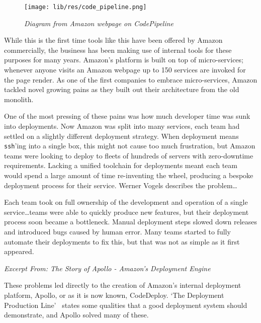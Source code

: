 \documentclass[11pt]{article}
\begin{document}
\begin{figure}
\centering
\texttt{[image: lib/res/code\_pipeline.png]}
\caption{\label{fig:scoping}\textit{Diagram from Amazon webpage on
CodePipeline}}
\end{figure}

While this is the first time tools like this have been offered by Amazon
commercially, the business has been making use of internal tools for these
purposes for many years. Amazon's platform is built on top of micro-services;
whenever anyone visits an Amazon webpage up to 150 services are invoked for the
page render. As one of the first companies to embrace micro-services, Amazon
tackled novel growing pains as they built out their architecture from the old
monolith.

One of the most pressing of these pains was how much developer time was sunk
into deployments. Now Amazon was split into many services, each team had settled
on a slightly different deployment strategy. When deployment means
\texttt{ssh}'ing into a single box, this might not cause too much frustration,
but Amazon teams were looking to deploy to fleets of hundreds of servers with
zero-downtime requirements. Lacking a unified toolchain for deployments meant
each team would spend a large amount of time re-inventing the wheel, producing a
bespoke deployment process for their service. Werner Vogels describes the
problem\dots

\begin{displayquote}

  Each team took on full ownership of the development and operation of a single
  service\dots teams were able to quickly produce new features, but their deployment
  process soon became a bottleneck. Manual deployment steps slowed down releases
  and introduced bugs caused by human error. Many teams started to fully
  automate their deployments to fix this, but that was not as simple as it first
  appeared.

  \textit{Excerpt From: The Story of Apollo - Amazon's Deployment
  Engine~\cite{theStoryOfApollo}}

\end{displayquote}

These problems led directly to the creation of Amazon's internal deployment
platform, Apollo, or as it is now known, CodeDeploy. `The Deployment Production
Line'~\cite{deploymentProductionLine} states some qualities that a good
deployment system should demonstrate, and Apollo solved many of these.
\end{document}
